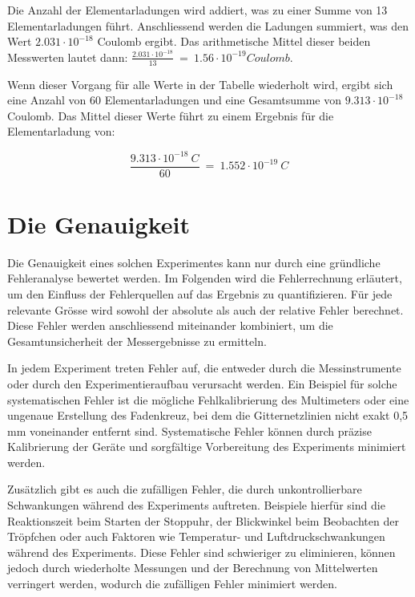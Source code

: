 \par
\noindent Die Anzahl der Elementarladungen wird addiert, was zu einer Summe von 13 Elementarladungen führt. Anschliessend werden die Ladungen summiert, was den Wert $2.031 \cdot 10^{-18}$ Coulomb ergibt. Das arithmetische Mittel dieser beiden Messwerten lautet dann: $\frac{2.031 \cdot 10^{-18}}{13} \ = \ 1.56 \cdot 10^{-19} Coulomb$. 

Wenn dieser Vorgang für alle Werte in der Tabelle wiederholt wird, ergibt sich eine Anzahl von 60 Elementarladungen und eine Gesamtsumme von $9.313 \cdot 10^{-18}$ Coulomb. Das Mittel dieser Werte führt zu einem Ergebnis für die Elementarladung von:

\begin{equation}\label{eq:ergebnis}
	\frac{9.313 \cdot 10^{-18}\ C}{60} \ = \ 1.552 \cdot 10^{-19}\ C
\end{equation}

\section{Die Genauigkeit}\label{sec:genauigkeitAuswertung}
Die Genauigkeit eines solchen Experimentes kann nur durch eine gründliche Fehleranalyse bewertet werden. Im Folgenden wird die Fehlerrechnung erläutert, um den Einfluss der Fehlerquellen auf das Ergebnis zu quantifizieren. Für jede relevante Grösse wird sowohl der absolute als auch der relative Fehler berechnet. Diese Fehler werden anschliessend miteinander kombiniert, um die Gesamtunsicherheit der Messergebnisse zu ermitteln.

In jedem Experiment treten Fehler auf, die entweder durch die Messinstrumente oder durch den Experimentieraufbau verursacht werden. Ein Beispiel für solche systematischen Fehler ist die mögliche Fehlkalibrierung des Multimeters oder eine ungenaue Erstellung des Fadenkreuz, bei dem die Gitternetzlinien nicht exakt 0,5 mm voneinander entfernt sind. Systematische Fehler können durch präzise Kalibrierung der Geräte und sorgfältige Vorbereitung des Experiments minimiert werden.

Zusätzlich gibt es auch die zufälligen Fehler, die durch unkontrollierbare Schwankungen während des Experiments auftreten. Beispiele hierfür sind die Reaktionszeit beim Starten der Stoppuhr, der Blickwinkel beim Beobachten der Tröpfchen oder auch Faktoren wie Temperatur- und Luftdruckschwankungen während des Experiments. Diese Fehler sind schwieriger zu eliminieren, können jedoch durch wiederholte Messungen und der Berechnung von Mittelwerten verringert werden, wodurch die zufälligen Fehler minimiert werden.

